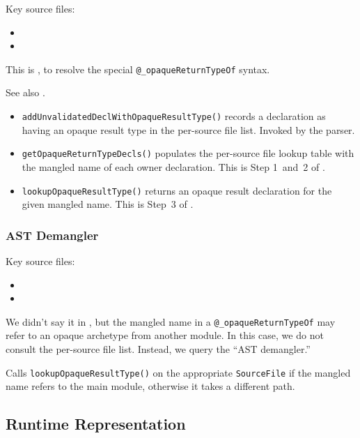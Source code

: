 \documentclass[../generics]{subfiles}
\begin{document}
Key source files:
\begin{itemize}
\item {}
\item {}
\end{itemize}

This is , to resolve the special \verb|@_opaqueReturnTypeOf| syntax.

See also .
\begin{itemize}
\item \texttt{addUnvalidatedDeclWithOpaqueResultType()} records a declaration as having an opaque result type in the per-source file list. Invoked by the parser.
\item \texttt{getOpaqueReturnTypeDecls()} populates the per-source file lookup table with the mangled name of each owner declaration. This is Step 1~and~2 of .
\item \texttt{lookupOpaqueResultType()} returns an opaque result declaration for the given mangled name. This is Step~3 of .
\end{itemize}

\subsubsection*{AST Demangler}

Key source files:
\begin{itemize}
\item {}
\item {}
\end{itemize}
We didn't say it in , but the mangled name in a \verb|@_opaqueReturnTypeOf| may refer to an opaque archetype from another module. In this case, we do not consult the per-source file list. Instead, we query the ``AST demangler.''

Calls \texttt{lookupOpaqueResultType()} on the appropriate \texttt{SourceFile} if the mangled name refers to the main module, otherwise it takes a different path.

\subsection*{Runtime Representation}
\end{document}
